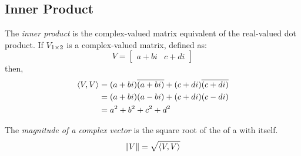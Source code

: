\subsection{Inner Product}\label{subsec:Inner_Product}
\begin{definition}\label{def:Inner_Product}
  The \emph{inner product} is the complex-valued matrix equivalent of the real-valued dot product.
  If $V_{1 \times 2}$ is a complex-valued matrix, defined as:
  \begin{equation*}
    V =
    \begin{bmatrix}
      a + bi & c + di
    \end{bmatrix}
  \end{equation*}
  then,
  \begin{equation}\label{eq:Inner_Product}
    \begin{aligned}
      \left\langle V, V \right\rangle &= (a+bi) \overline{(a+bi)} + (c+di) \overline{(c+di)} \\
      &= (a+bi) (a-bi) + (c+di) (c-di) \\
      &= a^{2} + b^{2} + c^{2} + d^{2}
    \end{aligned}
  \end{equation}

  \begin{remark}\label{rmk:Complex_Vector_Magnitude}
    The \emph{magnitude of a complex vector} is the square root of the  of a  with itself.
    \begin{equation}\label{eq:Complex_Vector_Magnitude}
      \lVert V \rVert = \sqrt{\left\langle V, V \right\rangle}
    \end{equation}
  \end{remark}
\end{definition}

